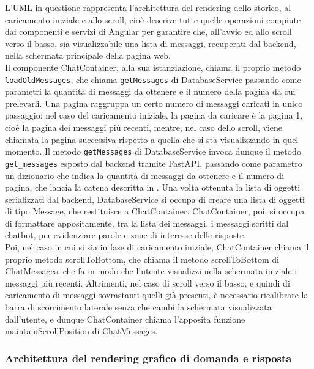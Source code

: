 L'UML in questione rappresenta l'architettura del rendering dello storico, al caricamento iniziale e allo scroll, cioè descrive tutte quelle operazioni compiute dai componenti e servizi di Angular per garantire che, all'avvio ed allo scroll verso il basso, sia visualizzabile una lista di messaggi, recuperati dal backend, nella schermata principale della pagina web.\\
Il componente ChatContainer, alla sua istanziazione, chiama il proprio metodo \texttt{loadOldMessages}, che chiama \texttt{getMessages} di DatabaseService passando come parametri la quantità di messaggi da ottenere e il numero della pagina da cui prelevarli. Una pagina raggruppa un certo numero di messaggi caricati in unico passaggio: nel caso del caricamento iniziale, la pagina da caricare è la pagina 1, cioè la pagina dei messaggi più recenti, mentre, nel caso dello scroll, viene chiamata la pagina successiva rispetto a quella che si sta visualizzando in quel momento. Il metodo \texttt{getMessages} di DatabaseService invoca dunque il metodo \texttt{get\_messages} esposto dal backend tramite FastAPI, passando come parametro un dizionario che indica la quantità di messaggi da ottenere e il numero di pagina, che lancia la catena descritta in . Una volta ottenuta la lista di oggetti serializzati dal backend, DatabaseService si occupa di creare una lista di oggetti di tipo Message, che restituisce a ChatContainer. ChatContainer, poi, si occupa di formattare appositamente, tra la lista dei messaggi, i messaggi scritti dal chatbot, per evidenziare parole e zone di interesse delle risposte.\\
Poi, nel caso in cui si sia in fase di caricamento iniziale, ChatContainer chiama il proprio metodo scrollToBottom, che chiama il metodo scrollToBottom di ChatMessages, che fa in modo che l'utente visualizzi nella schermata iniziale i messaggi più recenti. Altrimenti, nel caso di scroll verso il basso, e quindi di caricamento di messaggi sovrastanti quelli già presenti, è necessario ricalibrare la barra di scorrimento laterale senza che cambi la schermata visualizzata dall'utente, e dunque ChatContainer chiama l'apposita funzione maintainScrollPosition di ChatMessages.

\newpage


\subsubsection{Architettura del rendering grafico di domanda e risposta}
\label{sec:architettura_rendering_domanda_risposta}

